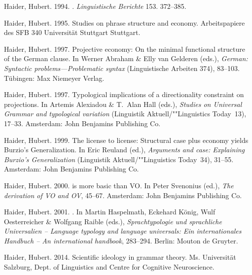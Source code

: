 \begin{thebibliography}{1420}
Haider, Hubert. 1994.
.
\newblock \emph{Linguistische Berichte} 153. 372--385.

Haider, Hubert. 1995.
\newblock Studies on phrase structure and economy.
\newblock Arbeitspapiere des SFB 340  Universit{\"a}t Stuttgart
  Stuttgart.

Haider, Hubert. 1997{}.
\newblock Projective economy: {On} the minimal functional structure of the
  {German} clause.
\newblock In Werner Abraham \& Elly {van Gelderen} (eds.), \emph{{German}:
  {Syntactic} problems---{Problematic} syntax} (Linguistische Arbeiten 374),
  83--103. T{\"u}bingen: Max Niemeyer Verlag.

Haider, Hubert. 1997{}.
\newblock Typological implications of a directionality constraint on
  projections.
\newblock In Artemis Alexiadou \& T.~Alan Hall (eds.), \emph{Studies on
  {Universal Grammar} and typological variation} (Linguistik
  Aktuell/""Linguistics Today~13), 17--33. Amsterdam: John Benjamins Publishing
  Co.

Haider, Hubert. 1999.
\newblock The license to license: {Structural} case plus economy yields
  {Burzio's Generalization}.
\newblock In Eric Reuland (ed.), \emph{Arguments and case: {Explaining Burzio's
  Generalization}} (Linguistik Aktuell/""Linguistics Today~34), 31--55.
  Amsterdam: John Benjamins Publishing Co.

Haider, Hubert. 2000.
 is more basic than {VO}.
\newblock In Peter Svenonius (ed.), \emph{The derivation of {VO} and {OV}},
  45--67. Amsterdam: John Benjamins Publishing Co.

Haider, Hubert. 2001.
.
\newblock In Martin Haspelmath, Eckehard K{\"o}nig, Wulf Oesterreicher \&
  Wolfgang Raible (eds.), \emph{{Sprachtypologie und sprachliche Universalien}
  -- {Language} typology and language universals: {Ein internationales
  Handbuch} -- {An} international handbook}, 283--294. Berlin: Mouton de
  Gruyter.

Haider, Hubert. 2014.
\newblock Scientific ideology in grammar theory.
\newblock Ms. Universit{\"a}t Salzburg, Dept. of Linguistics and Centre for
  Cognitive Neuroscience.


\end{thebibliography}
